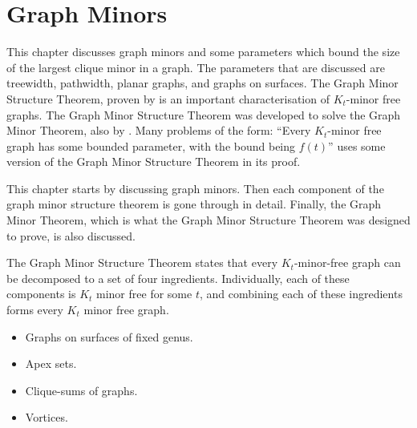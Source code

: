 \chapter{Graph Minors}\label{chap:gmst}
This chapter discusses graph minors and some parameters which bound the size of the largest clique minor in a graph. The parameters that are discussed are treewidth, pathwidth, planar graphs, and graphs on surfaces. 
The Graph Minor Structure Theorem, proven by \textcite{robertsonGraphMinorsXVI2003} is an important characterisation of $K_t$-minor free graphs. The Graph Minor Structure Theorem was developed to solve the Graph Minor Theorem, also by \textcite{robertsonGraphMinorsXX2004}. Many problems of the form: ``Every $K_t$-minor free graph has some bounded parameter, with the bound being $f(t)$'' uses some version of the Graph Minor Structure Theorem in its proof. 


This chapter starts by discussing graph minors. Then each component of the graph minor structure theorem is gone through in detail. Finally, the Graph Minor Theorem, which is what the Graph Minor Structure Theorem was designed to prove, is also discussed.

The Graph Minor Structure Theorem states that every $K_t$-minor-free graph can be decomposed to a set of four ingredients. Individually, each of these components is $K_t$ minor free for some $t$, and combining each of these ingredients forms every $K_t$ minor free graph. 
\begin{itemize}
	\item Graphs on surfaces of fixed genus.
	\item Apex sets.
	\item Clique-sums of graphs.
	\item Vortices.
\end{itemize}














